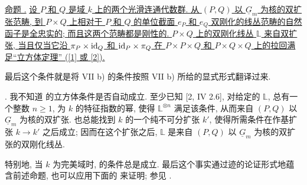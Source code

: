 \medskip
\noindent\underline{命题 .} \underline{设 $P$ 和 $Q$ 是域 $k$ 上的两个光滑连通代数群. 从 $(P,Q)$ 以 $\underline G_m$ 为核的双扩张范畴, 到 $P\times Q$ 上相对于 $P$ 和 $Q$ 的单位截面 $e_P$ 和 $e_Q$ 双刚化的线丛范畴的自然函子是全忠实的; 而且这两个范畴都是刚性的. $P\times Q$ 上的双刚化线丛 $\mathbb L$ 来自双扩张, 当且仅当它沿 $\pi_P\times\mathrm{id}_Q$ 和 $\mathrm{id}_P\times\pi_Q$ 在 $P\times P\times Q$ 和 $P\times Q\times Q$ 上的拉回满足“立方体定理” ([1] 或 [2]).}

最后这个条件就是将 VII  b) 的条件按照 VII  b) 所给的显式形式翻译过来.

\medskip
\noindent {}. 我不知道  的立方体条件是否自动成立. 至少已知 [2, IV 2.6], 对给定的 $\mathbb L$, 总有一个整数 $n\geq1$, 为 $k$ 的特征指数的幂, 使得 $\mathbb L^{\otimes n}$ 满足该条件, 从而来自 $(P,Q)$ 以 $\underline G_m$ 为核的双扩张. 也总能找到 $k$ 的一个纯不可分扩张 $k'$, 使得所需条件在作基扩张 $k\longrightarrow k'$ 之后成立; 因而在这个扩张之后, $\mathbb L$ 是来自 $(P,Q)$ 以 $\underline G_m$ 为核的双扩张的双刚化线丛.

特别地, 当 $k$ 为完美域时,  的条件总是成立. 最后这个事实通过迹的论证形式地蕴含前述命题, 也可以应用下面的  来证明; 参见 .




